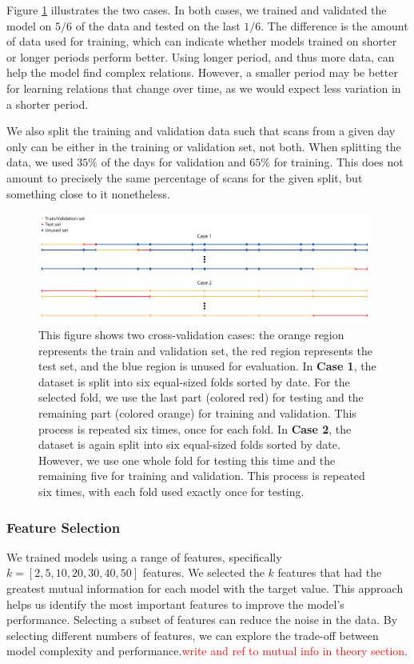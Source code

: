 Figure \ref{fig:datasplit_cases} illustrates the two cases.
In both cases, we trained and validated the model on $5/6$ of the data and tested on the last $1/6$.
The difference is the amount of data used for training, which can indicate whether models trained on shorter or longer periods perform better.
Using longer period, and thus more data, can help the model find complex relations.
However, a smaller period may be better for learning relations that change over time, as we would expect less variation in a shorter period.

We also split the training and validation data such that scans from a given day only can be either in the training or validation set, not both.
When splitting the data, we used $35\%$ of the days for validation and $65\%$ for training.
This does not amount to precisely the same percentage of scans for the given split, but something close to it nonetheless.


\begin{figure}[H]
    \centering
    \includegraphics[width=0.98\textwidth]{Canva/datasplits.png}
    \caption{This figure shows two cross-validation cases: the orange region represents the train and validation set, the red region represents the test set, and the blue region is unused for evaluation.
    In \textbf{Case 1}, the dataset is split into six equal-sized folds sorted by date.
    For the selected fold, we use the last part (colored red) for testing and the remaining part (colored orange) for training and validation.
    This process is repeated six times, once for each fold.
    In \textbf{Case 2}, the dataset is again split into six equal-sized folds sorted by date.
    However, we use one whole fold for testing this time and the remaining five for training and validation.
    This process is repeated six times, with each fold used exactly once for testing.}
    \label{fig:datasplit_cases}
\end{figure}




\subsubsection{Feature Selection}
We trained models using a range of features, specifically $k=[2,5,10,20,30,40,50]$ features.
We selected the $k$ features that had the greatest mutual information for each model with the target value.
This approach helps us identify the most important features to improve the model's performance. Selecting a subset of features can reduce the noise in the data. 
By selecting different numbers of features, we can explore the trade-off between model complexity and performance.\textcolor{red}{write and ref to mutual info in theory section}.

